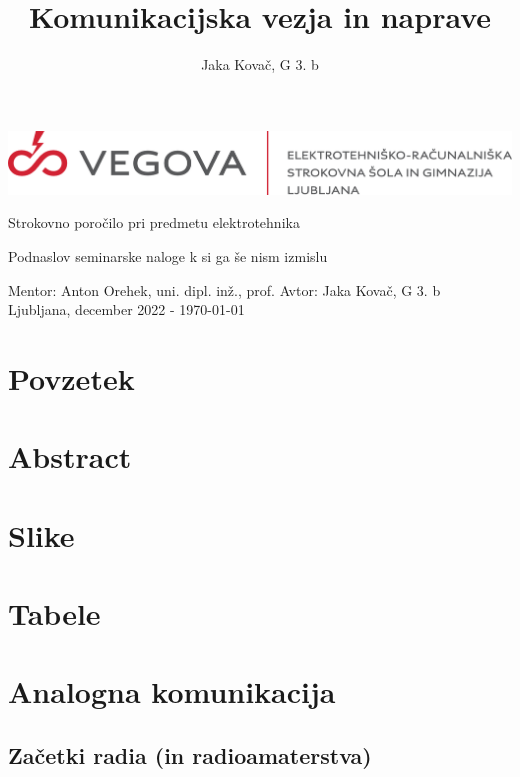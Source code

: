 \documentclass[12pt]{article}
\author{Jaka Kovač, G 3. b}
\begin{document}

\begin{center}
    \thispagestyle{empty}
    \includegraphics[scale=1]{slike/logotip_vegova_leze_brezokvirja.png}
    
    \vspace{\fill} 
    Strokovno poročilo pri predmetu elektrotehnika

    \title{Komunikacijska vezja in naprave}

    \normalsize
    Podnaslov seminarske naloge k si ga še nism izmislu
    \vspace{\fill}

    Mentor: Anton Orehek, uni. dipl. inž., prof. \hfill Avtor: Jaka Kovač, G 3. b\\
    \null
    Ljubljana, december 2022 - \MMYYYYdate\today
\end{center}
\newpage
\null
\newpage

\section*{Povzetek}
\section*{Abstract}

\newpage
\tableofcontents

\newpage
\begingroup
\makeatletter
\section*{Slike}
\let\clearpage\relax
\section*{Tabele}
\makeatother
\endgroup


\newpage
\section{Analogna komunikacija}
\subsection{Začetki radia (in radioamaterstva)}
\end{document}
